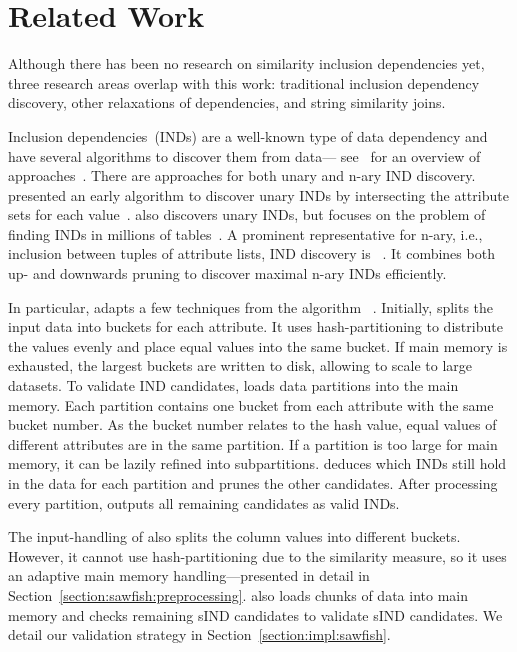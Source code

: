 \section{Related Work}
\label{section:related_work2}

Although there has been no research on similarity inclusion dependencies yet, three research areas overlap with this work: traditional inclusion dependency discovery, other relaxations of dependencies, and string similarity joins.

Inclusion dependencies~(INDs) are a well-known type of data dependency and have several algorithms to discover them from data--- see~\citeauthor{dursch2019eval} for an overview of approaches~\cite{dursch2019eval}.
There are approaches for both unary and n-ary IND discovery.
\citeauthor{deMarchiIND} presented an early algorithm to discover unary INDs by intersecting the attribute sets for each value~\cite{deMarchiIND}.
 also discovers unary INDs, but focuses on the problem of finding INDs in millions of tables~\cite{Tschirschnitz2017MANY}.
A prominent representative for n-ary, i.e., inclusion between tuples of attribute lists, IND discovery is ~\cite{deMarchi2003ZIGZAG}.
It combines both up- and downwards pruning to discover maximal n-ary INDs efficiently.


In particular, \sawfish adapts a few techniques from the algorithm ~\cite{papenbrock2015divide}.
Initially,  splits the input data into buckets for each attribute. 
It uses hash-partitioning to distribute the values evenly and place equal values into the same bucket.
If main memory is exhausted, the largest buckets are written to disk, allowing  to scale to large datasets.
To validate IND candidates,  loads data partitions into the main memory.
Each partition contains one bucket from each attribute with the same bucket number.
As the bucket number relates to the hash value, equal values of different attributes are in the same partition.
If a partition is too large for main memory, it can be lazily refined into subpartitions.
 deduces which INDs still hold in the data for each partition and prunes the other candidates.
After processing every partition,  outputs all remaining candidates as valid INDs.

The input-handling of \sawfish also splits the column values into different buckets.
However, it cannot use hash-partitioning due to the similarity measure, so it uses an adaptive main memory handling---presented in detail in Section~\ref{section:sawfish:preprocessing}.
\sawfish also loads chunks of data into main memory and checks remaining sIND candidates to validate sIND candidates.
We detail our validation strategy in Section~\ref{section:impl:sawfish}.

